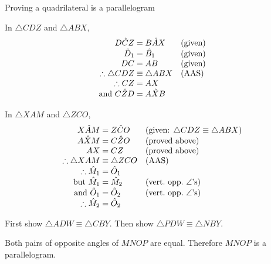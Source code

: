 \begin{wex}{Proving a quadrilateral is a parallelogram}
{  
  In $\triangle CDZ$ and $\triangle ABX$,
  \begin{equation*}
    \begin{array}{r@{\;}l@{\quad}l}
      D\hat{C}Z &= B\hat{A}X & \mbox{(given)} \\
      \hat{D}_{1} &= \hat{B}_{1} & \mbox{(given)} \\
      DC &= AB & \mbox{(given)}\\
      \therefore \triangle CDZ &\equiv \triangle ABX & \mbox{(AAS)} \\ 
      \therefore CZ &= AX & \\
      \mbox{and } C\hat{Z}D  &=  A\hat{X}B&
    \end{array}
  \end{equation*}

  In $\triangle XAM$ and $\triangle ZCO$,
  \begin{equation*}
    \begin{array}{r@{\;}l@{\quad}l}
      X\hat{A}M &= Z\hat{C}O & \mbox{(given: $\triangle CDZ \equiv \triangle ABX$)} \\
      A\hat{X}M &= C\hat{Z}O & \mbox{(proved above)} \\
      AX &= CZ & \mbox{(proved above)} \\
      \therefore \triangle XAM &\equiv \triangle ZCO & \mbox{(AAS)} \\
      \therefore  \hat{M}_{1}&=  \hat{O}_{1}& \\
      \mbox{but } \hat{M}_1 &= \hat{M}_2 & \mbox{(vert.\ opp.\ $\angle$'s)} \\
      \mbox{and } \hat{O}_{1} &= \hat{O}_2 & \mbox{(vert.\ opp.\ $\angle$'s)} \\
      \therefore \hat{M}_2 &= \hat{O}_{2} &
    \end{array}
  \end{equation*}

  First show $\triangle ADW \equiv \triangle CBY$. Then show $\triangle
  PDW \equiv \triangle NBY$.

  Both pairs of opposite angles of $MNOP$ are equal. Therefore $MNOP$ is
  a parallelogram.
}
\end{wex}


